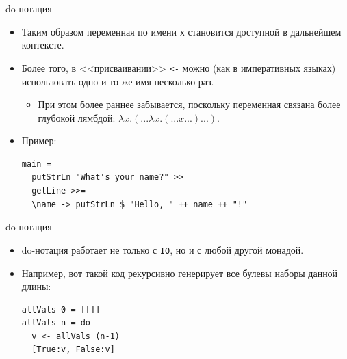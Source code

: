 \documentclass[xcolor=dvipsnames]{beamer}
\begin{document}
\begin{frame}[fragile]{do-нотация}
 
 \begin{itemize}[<+->]
 \item Таким образом переменная по имени {\tt x} становится доступной в дальнейшем контексте.
 \item Более того, в <<присваивании>> \texttt{<-} можно (как в императивных языках) использовать одно и то же имя несколько раз.
 \begin{itemize}
 \item При этом более раннее забывается, поскольку переменная связана более глубокой лямбдой: $\lambda x. (... \lambda x. (... x ...) ...)$.
 \end{itemize}
 \item Пример:
 \begin{verbatim}
main =
  putStrLn "What's your name?" >>
  getLine >>=
  \name -> putStrLn $ "Hello, " ++ name ++ "!"
 \end{verbatim}
 
 \end{itemize}

\end{frame}

\begin{frame}[fragile]{do-нотация}
 \begin{itemize}[<+->]
 \item do-нотация работает не только с \texttt{IO}, но и с любой другой монадой.
 \item Например, вот такой код рекурсивно генерирует все булевы наборы данной длины:
 
 {
\scriptsize
\begin{verbatim}
allVals 0 = [[]]
allVals n = do
  v <- allVals (n-1)
  [True:v, False:v]
\end{verbatim}

}

\end{itemize}
\end{frame}
\end{document}

